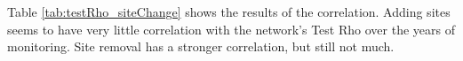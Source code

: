 
Table \ref{tab:testRho_siteChange} shows the results of the correlation.  Adding sites seems to have very little correlation with the network's Test Rho over the years of monitoring.  Site removal has a stronger correlation, but still not much.